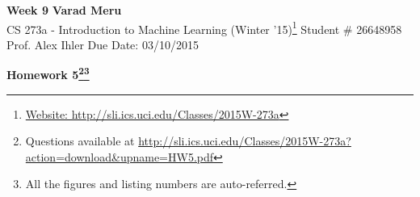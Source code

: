 \documentclass[a4paper, 11pt]{article}
\begin{document}
\begin{noindent}
\large\textbf{Week 9} \hfill \textbf{Varad Meru} \\
\normalsize CS 273a - Introduction to Machine Learning (Winter '15)\footnote{\href{http://sli.ics.uci.edu/Classes/2015W-273a}{Website: http://sli.ics.uci.edu/Classes/2015W-273a}} \hfill Student \# 26648958 \\
Prof. Alex Ihler \hfill Due Date: 03/10/2015
\end{noindent}	
\noindent\makebox[\linewidth]{\rule{\textwidth}{0.4pt}}

\begin{center}
\textbf{\Large{Homework 5}\footnote{Questions available at \href{http://sli.ics.uci.edu/Classes/2015W-273a?action=download\&upname=HW5.pdf}{http://sli.ics.uci.edu/Classes/2015W-273a?action=download\&upname=HW5.pdf}}\footnote{All the figures and listing numbers are auto-referred.}}\\
\end{center}
\vspace{-25pt}

\end{document}
